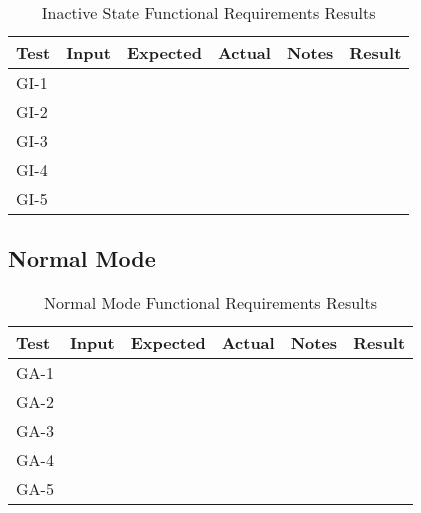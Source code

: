 \documentclass[12pt, titlepage]{article}
\begin{document}
\begin{table}[H]
    \centering
        \setlength{\leftmargini}{0.4cm}
        \begin{tabular}{| >{\centering\arraybackslash}m{1cm} | 
            >{\centering\arraybackslash}m{2.5cm} | 
            >{\centering\arraybackslash}m{4cm} | 
            >{\centering\arraybackslash}m{3cm} |
            >{\centering\arraybackslash}m{3cm} |
            >{\centering\arraybackslash}m{1.5cm} |}
        \hline
        \rowcolor[gray]{0.9}
        Test & Input & Expected & Actual & Notes & Result\\
        \hline
        GI-1 &  &  &  &  & \\
        \hline
        GI-2 &  &  &  &  & \\
        \hline
        GI-3 &  &  &  &  & \\
        \hline
        GI-4 &  &  &  &  & \\
        \hline
        GI-5 &  &  &  &  & \\
        \hline
        \end{tabular}
    \caption{Inactive State Functional Requirements Results}
\end{table}

\subsection{Normal Mode}

\begin{table}[H]
    \centering
        \setlength{\leftmargini}{0.4cm}
        \begin{tabular}{| >{\centering\arraybackslash}m{1cm} | 
            >{\centering\arraybackslash}m{2.5cm} | 
            >{\centering\arraybackslash}m{4cm} | 
            >{\centering\arraybackslash}m{3cm} |
            >{\centering\arraybackslash}m{3cm} |
            >{\centering\arraybackslash}m{1.5cm} |}
        \hline
        \rowcolor[gray]{0.9}
        Test & Input & Expected & Actual & Notes & Result\\
        \hline
        GA-1 &  &  &  &  & \\
        \hline
        GA-2 &  &  &  &  & \\
        \hline
        GA-3 &  &  &  &  & \\
        \hline
        GA-4 &  &  &  &  & \\
        \hline
        GA-5 &  &  &  &  & \\
        \hline
        \end{tabular}
    \caption{Normal Mode Functional Requirements Results}
\end{table}
\end{document}
